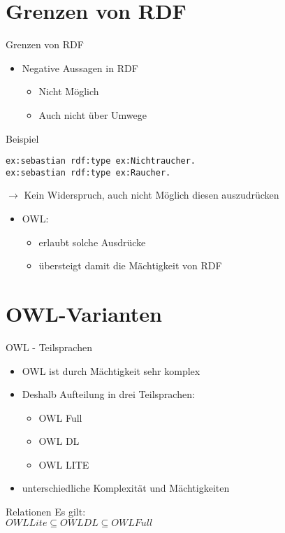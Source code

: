 \documentclass{beamer}
\begin{document}

\section{Grenzen von RDF}

\begin{frame}[fragile]{Grenzen von RDF}
\begin{itemize}
\item Negative Aussagen in RDF
\begin{itemize}
\item Nicht Möglich
\item Auch nicht über Umwege
\end{itemize}
\end{itemize}
\begin{exampleblock}{Beispiel}
\begin{lstlisting}
ex:sebastian rdf:type ex:Nichtraucher.
ex:sebastian rdf:type ex:Raucher.
\end{lstlisting}
$\rightarrow$ Kein Widerspruch, auch nicht Möglich diesen auszudrücken
\end{exampleblock}

\begin{itemize}
\item OWL:
\begin{itemize}
\item erlaubt solche Ausdrücke
\item übersteigt damit die Mächtigkeit von RDF
\end{itemize}
\end{itemize}
\end{frame}


\section{OWL-Varianten}
\begin{frame}{OWL - Teilsprachen}
\begin{itemize}
	\item OWL ist durch Mächtigkeit sehr komplex
	\item Deshalb Aufteilung in drei Teilsprachen:
\begin{itemize}
	\item OWL Full
	\item OWL DL
	\item OWL LITE
\end{itemize}
	\item unterschiedliche Komplexität und Mächtigkeiten
\end{itemize}
\begin{block}{Relationen}
	Es gilt:\\
	$OWL Lite \subseteq OWL DL \subseteq OWL Full$
\end{block}
\end{frame}
\end{document}
